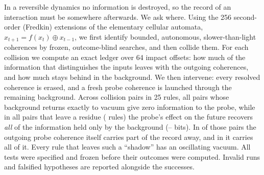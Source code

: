In a reversible dynamics no information is destroyed, so the record of an interaction must be
somewhere afterwards. We ask where. Using the 256 second-order (Fredkin) extensions of the
elementary cellular automata, $x_{t+1}=f(x_t)\oplus x_{t-1}$, we first identify bounded, autonomous,
slower-than-light coherences by frozen, outcome-blind searches, and then collide them. For each
collision we compute an exact ledger over 64 impact offsets: how much of the information that
distinguishes the inputs leaves with the outgoing coherences, and how much stays behind in the
background. We then intervene: every resolved coherence is erased, and a fresh probe coherence is
launched through the remaining background. Across \nsthreePairs{} collision pairs in 25 rules, all
\nsthreeClean{} pairs whose background returns exactly to vacuum give zero information to the probe,
while in all \nsthreeShadow{} pairs that leave a residue (\nsthreeShadowRules{} rules) the probe's effect on
the future recovers \emph{all} of the information held only by the background
(\nonlyMin--\nonlyMax{} bits). In \nsthreeStatePos{} of those pairs the outgoing probe coherence itself carries
part of the record away, and in \nsthreeStateOne{} it carries all of it. Every rule that leaves such a
``shadow'' has an oscillating vacuum. All tests were specified and frozen before their outcomes
were computed. Invalid runs and falsified hypotheses are reported alongside the successes.
